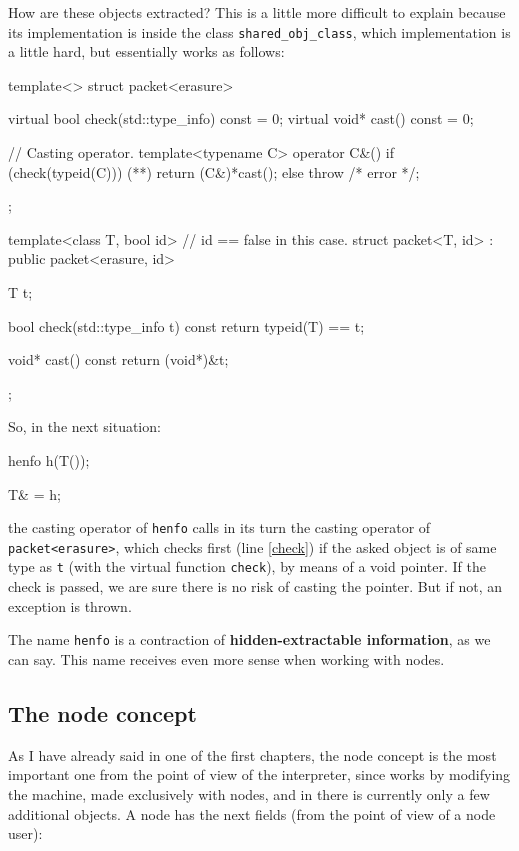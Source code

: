 \documentclass{article}
\begin{document}
How are these objects extracted? This is a little more difficult to explain
because its implementation is inside the class
\texttt{shared\_obj\_class}, which implementation is a little hard, but
essentially works as follows:

\begin{Cpp}
  template<>
  struct packet<erasure> {
     virtual bool check(std::type_info) const = 0;
     virtual void* cast() const = 0;

     // Casting operator.
     template<typename C>
     operator C&()
     {
       if (check(typeid(C))) (*\label{check}*)
          return (C&)*cast();
       else throw /* error */;
     }
  };

  template<class T, bool id> // id == false in this case.
  struct packet<T, id> : public packet<erasure, id>
  {
     T t;

     bool check(std::type_info t) const
     {
       return typeid(T) == t;
     }

     void* cast() const { return (void*)&t; }
  };

\end{Cpp}

So, in the next situation:

\begin{Cpp}
  henfo h(T());

  T& = h;
\end{Cpp}

\noindent the casting operator of \texttt{henfo} calls in its turn the casting
operator of \texttt{packet<erasure>}, which checks first (line \ref{check}) if
the asked object is of same type as \texttt{t} (with the virtual function
\texttt{check}), by means of a void pointer. If the check is passed, we are sure
there is no risk of casting the pointer. But if not, an exception is thrown.

The name \texttt{henfo} is a contraction of \textbf{hidden-extractable
  information}, as we can say. This name receives even more sense when working
with nodes.

\subsection{The node concept}
\label{ssec:nodes}
As I have already said in one of the first chapters, the node concept is the
most important one from the point of view of the \faupp interpreter, since
\faupp works by modifying the machine, made exclusively with nodes, and in \fav
there is currently only a few additional objects. A node has the next fields
(from the point of view of a node user):
\end{document}
